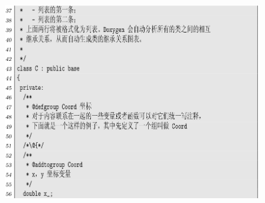 \documentclass[12pt,a4paper]{article}
\begin{document}
\begin{figure}[H]
\centering
\includegraphics[scale=0.5]{./figures/16.png}
\caption{}
\end{figure}
\end{document}

